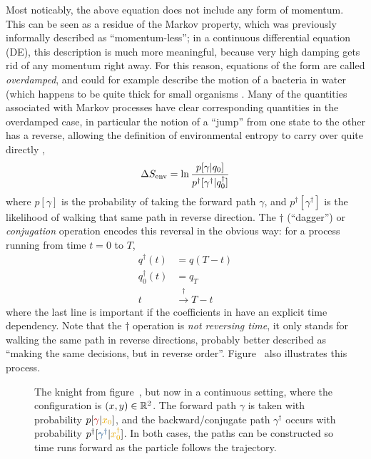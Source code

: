 Most noticably, the above equation does not include any form of momentum. This can be seen as a residue of the Markov property, which was previously informally described as ``momentum-less''; in a continuous differential equation (DE), this description is much more meaningful, because very high damping gets rid of any momentum right away. For this reason, equations of the form  are called \emph{overdamped}, and could for example describe the motion of a bacteria in water (which happens to be quite thick for small organisms \cite{sengupta}. Many of the quantities associated with Markov processes have clear corresponding quantities in the overdamped case, in particular the notion of a ``jump'' from one state to the other has a reverse, allowing the definition of environmental entropy to carry over quite directly \cite{seifert-overdamped},
%
\begin{equation}
	\Delta S_\text{env} = \ln\frac{p[\gamma | q_0]}{p^\dagger[\gamma^\dagger | q_0^\dagger]}
\end{equation}
%
where \(p[\gamma]\) is the probability of taking the forward path \(\gamma\), and \(p^\dagger[\gamma^\dagger]\) is the likelihood of walking that same path in reverse direction. The \(\dagger\) (``dagger'') or \emph{conjugation} operation encodes this reversal in the obvious way: for a process running from time \(t=0\) to \(T\),
%
\begin{equation}
	\begin{split}
		q^\dagger(t) &= q(T-t) \\
		q_0^\dagger(t) &= q_T \\
		t &\overset\dagger\rightarrow T-t
	\end{split}
\end{equation}
%
where the last line is important if the coefficients in  have an explicit time dependency. Note that the \(\dagger\) operation is \emph{not reversing time}, it only stands for walking the same path in reverse directions, probably better described as ``making the same decisions, but in reverse order''. Figure~ also illustrates this process.

\begin{figure}[htbp]
	\centering
	
	\caption[]{
		The knight from figure~, but now in a continuous setting, where the configuration is \((x,y)\in\mathbb{R}^2\). The {\color{red}forward path \(\gamma\)} is taken with probability \(p[{\color{red}\gamma}|{\color{yellow}x_0}]\), and the {\color{blue}backward/conjugate path \(\gamma^\dagger\)} occurs with probability \(p^\dagger[{\color{blue}\gamma^\dagger}|{\color{yellow}x_0^\dagger}]\). In both cases, the paths can be constructed so time runs forward as the particle follows the trajectory.
	}
	\label{fig:knight continuous}
\end{figure}

